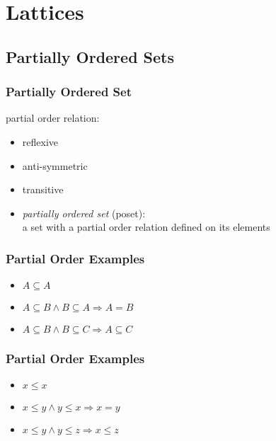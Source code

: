 \documentclass[dvipsnames]{beamer}
\begin{document}
\section{Lattices}

\subsection{Partially Ordered Sets}

\begin{frame}
  \frametitle{Partially Ordered Set}

  \begin{definition}
    \alert{partial order relation}:
    \begin{itemize}
      \item reflexive
      \item anti-symmetric
      \item transitive
    \end{itemize}
  \end{definition}

  \pause
  \begin{itemize}
    \item \emph{partially ordered set} (\alert{poset}):\\
      a set with a partial order relation defined on its elements
  \end{itemize}
\end{frame}

\begin{frame}
  \frametitle{Partial Order Examples}

  \begin{example}
    \begin{itemize}
      \item $A \subseteq A$
      \item $A \subseteq B \wedge B \subseteq A \Rightarrow A = B$
      \item $A \subseteq B \wedge B \subseteq C \Rightarrow A \subseteq C$
    \end{itemize}
  \end{example}
\end{frame}

\begin{frame}
  \frametitle{Partial Order Examples}

  \begin{example}
    \begin{itemize}
      \item $x \leq x$
      \item $x \leq y \wedge y \leq x \Rightarrow x = y$
      \item $x \leq y \wedge y \leq z \Rightarrow x \leq z$
    \end{itemize}
  \end{example}
\end{frame}
\end{document}
